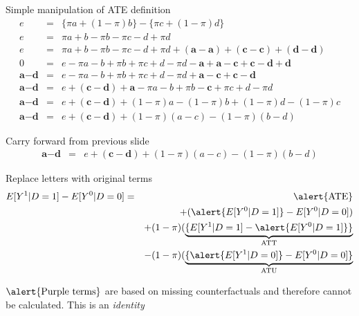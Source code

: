 \documentclass{beamer}
\begin{document}
\begin{frame}[plain]

  \begin{block}{Simple manipulation of ATE definition}
    \begin{eqnarray*}
      e&=&\{\pi{a} + (1-\pi)b\} - \{\pi{c} + (1-\pi)d\}  \\
      e&=&\pi{a} + b - \pi{b} - \pi{c} - d + \pi{d}  \\
      e&=&\pi{a} + b - \pi{b} - \pi{c} - d + \pi{d} + (\textbf{a} - \textbf{a}) + (\textbf{c} - \textbf{c}) + (\textbf{d} - \textbf{d})  \\
      0&=&e-\pi{a} - b + \pi{b} + \pi{c} + d - \pi{d} - \textbf{a} + \textbf{a} - \textbf{c} + \textbf{c} - \textbf{d} + \textbf{d}  \\
      \textbf{a}-\textbf{d}&=&e-\pi{a} - b + \pi{b} + \pi{c} + d - \pi{d}  + \textbf{a} - \textbf{c} + \textbf{c} - \textbf{d}  \\
      \textbf{a}-\textbf{d}&=&e  + (\textbf{c} - \textbf{d}) + \textbf{a}-\pi{a} - b + \pi{b} - \textbf{c} + \pi{c} + d - \pi{d} \\
      \textbf{a}-\textbf{d}&=&e  + (\textbf{c} - \textbf{d}) + (1-\pi)a -(1-\pi)b + (1-\pi)d - (1-\pi)c  \\
      \textbf{a}-\textbf{d}&=&e  + (\textbf{c} - \textbf{d}) + (1-\pi)(a-c) -(1-\pi)(b-d)
    \end{eqnarray*}
  \end{block}


\end{frame}

\begin{frame}[shrink=20,plain]
  \begin{block}{Carry forward from previous slide}
    \begin{eqnarray*}
      \textbf{a}-\textbf{d}&=&e  + (\textbf{c} - \textbf{d}) + (1-\pi)(a-c) -(1-\pi)(b-d)
    \end{eqnarray*}
  \end{block}

  \begin{block}{Replace letters with original terms }
    \begin{eqnarray*}
      E[Y^1|D=1] - E[Y^0|D=0] &=& \alert{\text{ATE}}  \\
      &&+ (\alert{E[Y^0|D=1]} - E[Y^0|D=0])  \\
      && + (1-\pi)( \underbrace{\{E[Y^1|D=1] - \alert{E[Y^0|D=1]}\}}_{ \mathclap{\text{ATT}}}  \\
      && - (1-\pi)( \underbrace{\{\alert{E[Y^1|D=0]} - {E[Y^0|D=0]}\}}_{ \mathclap{\text{ATU}}}  \\
    \end{eqnarray*}
  \end{block}
  
$\alert{\text{Purple terms}}$ are based on missing counterfactuals and therefore cannot be calculated. This is an \emph{identity}
  
\end{frame}
\end{document}

